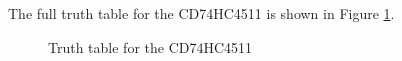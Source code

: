 \documentclass{UoNMCHA}
\numberwithin{equation}{section}
\begin{document}
The full truth table for the CD74HC4511 is shown in Figure \ref{fig:ttable}.

\begin{figure}[H]
\caption{Truth table for the CD74HC4511}
\label{fig:ttable}
\end{figure}

\pagebreak
\end{document}
